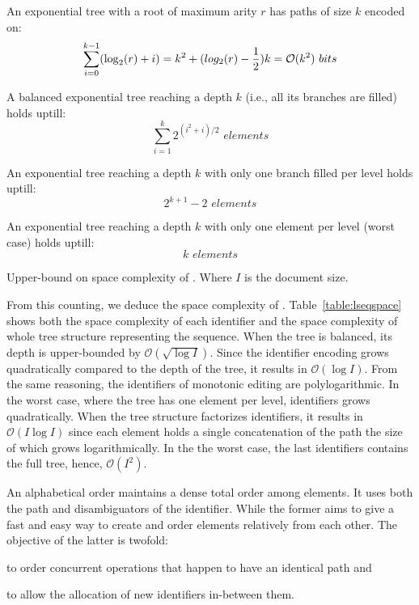 \begin{asparadesc}
  An exponential tree with a root of maximum arity $r$ has paths of size $k$
  encoded on:
  \begin{equation}
    \sum\limits_{i=0}^{k-1}(\log_2(r)+i) =k^2+(log_2(r)-{1\over{2}})k =
    \mathcal{O}(k^2) \,\, bits
  \end{equation}

  A balanced exponential tree reaching a depth $k$ (i.e., all its branches are
  filled) holds uptill:
  \begin{equation}
    \sum\limits_{i=1}^{k} {2^{(i^2+i)/2}} \,\, elements
  \end{equation}

  An exponential tree reaching a depth $k$ with only one branch filled per level
  holds uptill:
  \begin{equation}
    2^{k+1}-2 \,\, elements
  \end{equation}

  An exponential tree reaching a depth $k$ with only one element per level
  (worst case) holds uptill: 
  \begin{equation}
    k \,\, elements
  \end{equation}

  \begin{table}
    \centering
    
    \caption{\label{table:lseqspace}
      Upper-bound on space complexity of \LSEQ. Where $I$ is the document size.}
  \end{table}
  
  From this counting, we deduce the space complexity of
  \LSEQ. Table~\ref{table:lseqspace} shows both the space complexity of each
  identifier and the space complexity of whole tree structure representing the
  sequence. When the tree is balanced, its depth is upper-bounded by
  $\mathcal{O}(\sqrt{\log I})$. Since the identifier encoding grows
  quadratically compared to the depth of the tree, it results in
  $\mathcal{O}(\log I)$. From the same reasoning, the identifiers of monotonic
  editing are polylogarithmic. In the worst case, where the tree has one element
  per level, identifiers grows quadratically. When the tree structure factorizes
  identifiers, it results in $\mathcal{O}(I\log I)$ since each element holds a
  single concatenation of the path the size of which grows logarithmically.  In
  the the worst case, the last identifiers contains the full tree, hence,
  $\mathcal{O}(I^2)$.
  
  An alphabetical order maintains a dense total order among elements. It uses
  both the path and disambiguators of the identifier. While the former aims to
  give a fast and easy way to create and order elements relatively from each
  other. The objective of the latter is twofold:
  \begin{inparaenum}[(i)]
  \item to order concurrent operations that happen to have an identical path and
  \item to allow the allocation of new identifiers in-between them.
  \end{inparaenum}


\end{asparadesc}
